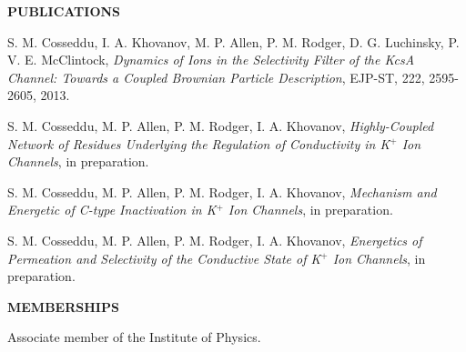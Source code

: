 \documentclass[a4paper,10pt,final]{letter}
\newcommand{\Sep}{\vspace{1em}}
\newcommand{\SmallSep}{\vspace{0.4em}}
\newcommand{\CVSection}[1]
	{\Large\textbf{#1}\par
	\SmallSep\normalsize\normalfont}
\begin{document}
\Sep
\CVSection{PUBLICATIONS} 
\begin{compactitem}[\color{RoyalBlue}$\circ$]
\item S. M. Cosseddu, I. A. Khovanov, M. P. Allen, P. M. Rodger, D. G. Luchinsky,
  P. V. E. McClintock, \textit{Dynamics of Ions in the Selectivity Filter of the KcsA
    Channel: Towards a Coupled Brownian Particle Description}, EJP-ST, 222, 2595-2605,
  2013.
\item S. M. Cosseddu, M. P. Allen, P. M. Rodger, I. A. Khovanov, \textit{Highly-Coupled Network of
    Residues Underlying the Regulation of Conductivity in K$^+$ Ion Channels}, in preparation.
\item S. M. Cosseddu, M. P. Allen, P. M. Rodger, I. A. Khovanov, \textit{Mechanism and Energetic
  of C-type Inactivation in K$^+$ Ion Channels}, in preparation.
\item S. M. Cosseddu, M. P. Allen, P. M. Rodger, I. A. Khovanov, \textit{Energetics of
    Permeation and Selectivity of the Conductive State of K$^+$ Ion Channels}, in
  preparation.
\end{compactitem}

\Sep
\CVSection{MEMBERSHIPS} 
Associate member of the Institute of Physics. 

\end{document}
